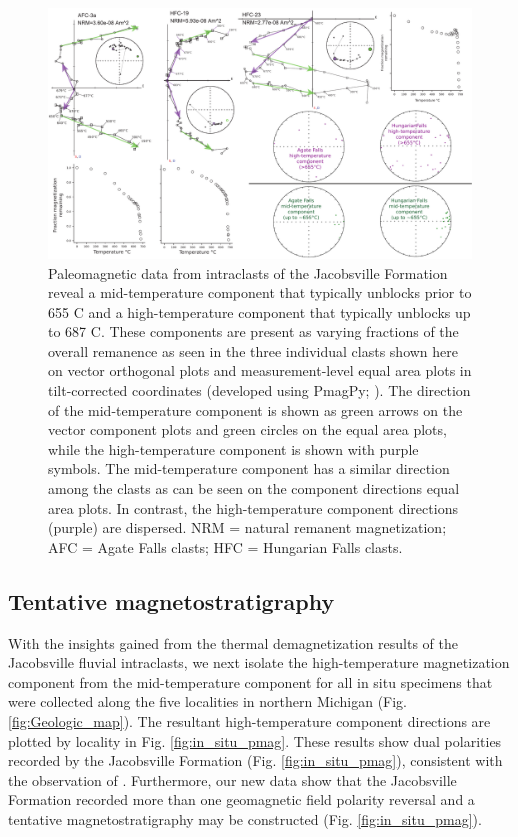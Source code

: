 \documentclass[draft]{agujournal2019}
\begin{document}
\begin{figure}[h!]
\centering
\includegraphics[width=\textwidth]{Intraclast_pmag.pdf}
\caption{Paleomagnetic data from intraclasts of the Jacobsville Formation reveal a mid-temperature component that typically unblocks prior to 655 \textdegree C and a high-temperature component that typically unblocks up to 687 \textdegree C. These components are present as varying fractions of the overall remanence as seen in the three individual clasts shown here on vector orthogonal plots and measurement-level equal area plots in tilt-corrected coordinates (developed using PmagPy; ). The direction of the mid-temperature component is shown as green arrows on the vector component plots and green circles on the equal area plots, while the high-temperature component is shown with purple symbols. The mid-temperature component has a similar direction among the clasts as can be seen on the component directions equal area plots. In contrast, the high-temperature component directions (purple) are dispersed. NRM = natural remanent magnetization; AFC = Agate Falls clasts; HFC = Hungarian Falls clasts.}
\label{fig:Intraclast_pmag}
\end{figure}

\subsection*{Tentative magnetostratigraphy}

With the insights gained from the thermal demagnetization results of the Jacobsville fluvial intraclasts, we next isolate the high-temperature magnetization component from the mid-temperature component for all in situ specimens that were collected along the five localities in northern Michigan (Fig. \ref{fig:Geologic_map}). The resultant high-temperature component directions are plotted by locality in Fig. \ref{fig:in_situ_pmag}. These results show dual polarities recorded by the Jacobsville Formation (Fig. \ref{fig:in_situ_pmag}), consistent with the observation of . Furthermore, our new data show that the Jacobsville Formation recorded more than one geomagnetic field polarity reversal and a tentative magnetostratigraphy may be constructed (Fig. \ref{fig:in_situ_pmag}). 
\end{document}
